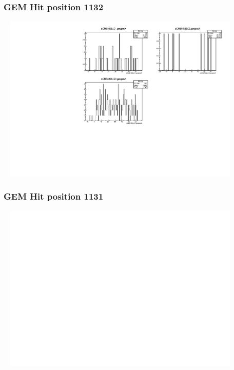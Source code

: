 \documentclass[slidestop,compress,mathserif]{beamer}
\begin{document}
\begin{frame}\frametitle{GEM Hit position 1132}
	 \includegraphics[width=12cm,height=8cm]{GEM_Hit_position_1132.pdf}
\end{frame}
\begin{frame}\frametitle{GEM Hit position 1131}
	 \includegraphics[width=12cm,height=8cm]{GEM_Hit_position_1131.pdf}
\end{frame}
\end{document}
